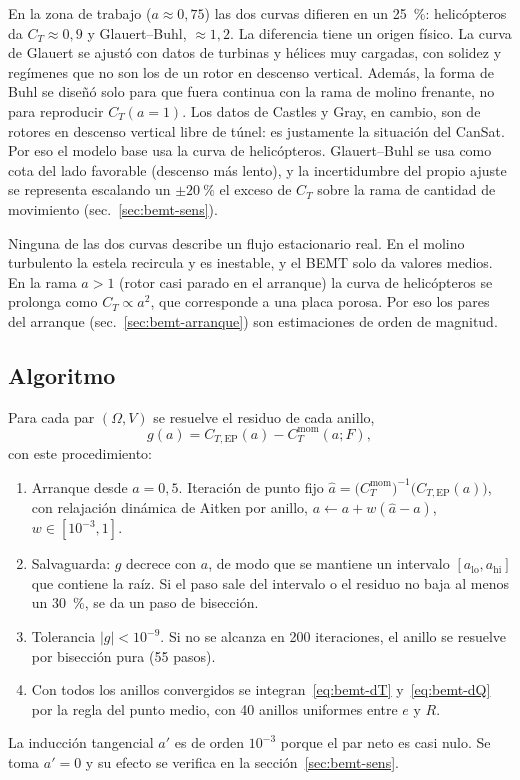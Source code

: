 En la zona de trabajo ($a\approx0{,}75$) las dos curvas difieren en un
\SI{25}{\percent}: helicópteros da $C_T\approx0{,}9$ y Glauert--Buhl, $\approx1{,}2$. La
diferencia tiene un origen físico. La curva de Glauert se ajustó con datos de turbinas y
hélices muy cargadas, con solidez y regímenes que no son los de un rotor en descenso
vertical. Además, la forma de Buhl se diseñó solo para que fuera continua con la rama de
molino frenante, no para reproducir $C_T(a=1)$. Los datos de Castles y Gray, en cambio,
son de rotores en descenso vertical libre de túnel: es justamente la situación del
CanSat. Por eso el modelo base usa la curva de helicópteros. Glauert--Buhl se usa como
cota del lado favorable (descenso más lento), y la incertidumbre del propio ajuste se
representa escalando un $\pm\SI{20}{\percent}$ el exceso de $C_T$ sobre la rama de
cantidad de movimiento (sec.~\ref{sec:bemt-sens}).

\begin{nota}
Ninguna de las dos curvas describe un flujo estacionario real. En el molino turbulento
la estela recircula y es inestable, y el BEMT solo da valores medios. En la rama
$a>1$ (rotor casi parado en el arranque) la curva de helicópteros se prolonga como
$C_T\propto a^2$, que corresponde a una placa porosa. Por eso los pares del arranque
(sec.~\ref{sec:bemt-arranque}) son estimaciones de orden de magnitud.
\end{nota}

\subsection{Algoritmo}\label{sec:bemt-alg}

Para cada par $(\Omega,V)$ se resuelve el residuo de cada anillo,
\begin{equation}
  g(a)=C_{T,\mathrm{EP}}(a)-C_T^{\mathrm{mom}}(a;F),
  \label{eq:bemt-res}
\end{equation}
con este procedimiento:
\begin{enumerate}
  \item Arranque desde $a=0{,}5$. Iteración de punto fijo
        $\hat a=\big(C_T^{\mathrm{mom}}\big)^{-1}\!\big(C_{T,\mathrm{EP}}(a)\big)$, con
        relajación dinámica de Aitken por anillo, $a\leftarrow a+w(\hat a-a)$,
        $w\in[10^{-3},1]$.
  \item Salvaguarda: $g$ decrece con $a$, de modo que se mantiene un intervalo
        $[a_\mathrm{lo},a_\mathrm{hi}]$ que contiene la raíz. Si el paso sale del
        intervalo o el residuo no baja al menos un \SI{30}{\percent}, se da un paso de
        bisección.
  \item Tolerancia $|g|<10^{-9}$. Si no se alcanza en 200 iteraciones, el anillo se
        resuelve por bisección pura (55 pasos).
  \item Con todos los anillos convergidos se integran~\eqref{eq:bemt-dT}
        y~\eqref{eq:bemt-dQ} por la regla del punto medio, con 40 anillos uniformes
        entre $e$ y $R$.
\end{enumerate}
La inducción tangencial $a'$ es de orden $10^{-3}$ porque el par neto es casi nulo. Se
toma $a'=0$ y su efecto se verifica en la sección~\ref{sec:bemt-sens}.

